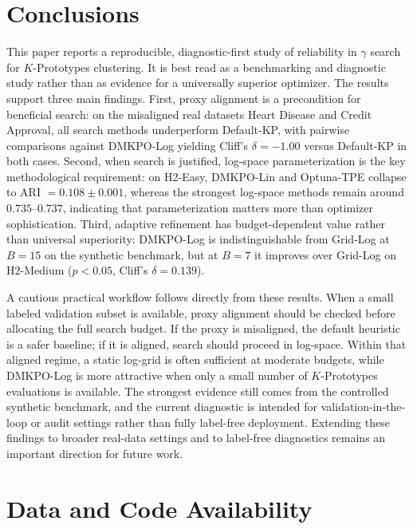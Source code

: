 \documentclass[10pt,lineno]{wlpeerj}
\begin{document}
\section*{Conclusions}

This paper reports a reproducible, diagnostic-first study of reliability in $\gamma$ search for $K$-Prototypes clustering. It is best read as a benchmarking and diagnostic study rather than as evidence for a universally superior optimizer. The results support three main findings. First, proxy alignment is a precondition for beneficial search: on the misaligned real datasets Heart Disease and Credit Approval, all search methods underperform Default-KP, with pairwise comparisons against DMKPO-Log yielding Cliff's $\delta=-1.00$ versus Default-KP in both cases. Second, when search is justified, log-space parameterization is the key methodological requirement: on H2-Easy, DMKPO-Lin and Optuna-TPE collapse to ARI $=0.108 \pm 0.001$, whereas the strongest log-space methods remain around $0.735$--$0.737$, indicating that parameterization matters more than optimizer sophistication. Third, adaptive refinement has budget-dependent value rather than universal superiority: DMKPO-Log is indistinguishable from Grid-Log at $B=15$ on the synthetic benchmark, but at $B=7$ it improves over Grid-Log on H2-Medium ($p<0.05$, Cliff's $\delta=0.139$).

A cautious practical workflow follows directly from these results. When a small labeled validation subset is available, proxy alignment should be checked before allocating the full search budget. If the proxy is misaligned, the default heuristic is a safer baseline; if it is aligned, search should proceed in log-space. Within that aligned regime, a static log-grid is often sufficient at moderate budgets, while DMKPO-Log is more attractive when only a small number of $K$-Prototypes evaluations is available. The strongest evidence still comes from the controlled synthetic benchmark, and the current diagnostic is intended for validation-in-the-loop or audit settings rather than fully label-free deployment. Extending these findings to broader real-data settings and to label-free diagnostics remains an important direction for future work.

\section*{Data and Code Availability}
\end{document}
